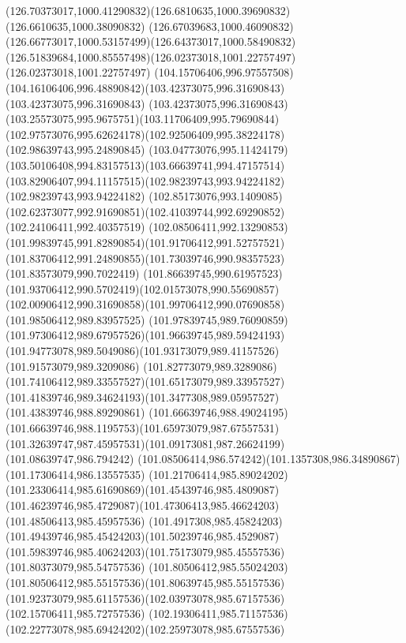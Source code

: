 {    \curveto(126.70373017,1000.41290832)(126.6810635,1000.39690832)(126.6610635,1000.38090832)
    \curveto(126.67039683,1000.46090832)(126.66773017,1000.53157499)(126.64373017,1000.58490832)
    \curveto(126.51839684,1000.85557498)(126.02373018,1001.22757497)(126.02373018,1001.22757497)
    \lineto(104.15706406,996.97557508)
    \curveto(104.16106406,996.48890842)(103.42373075,996.31690843)(103.42373075,996.31690843)
    \curveto(103.42373075,996.31690843)(103.25573075,995.9675751)(103.11706409,995.79690844)
    \curveto(102.97573076,995.62624178)(102.92506409,995.38224178)(102.98639743,995.24890845)
    \curveto(103.04773076,995.11424179)(103.50106408,994.83157513)(103.66639741,994.47157514)
    \curveto(103.82906407,994.11157515)(102.98239743,993.94224182)(102.98239743,993.94224182)
    \lineto(102.85173076,993.1409085)
    \curveto(102.62373077,992.91690851)(102.41039744,992.69290852)(102.24106411,992.40357519)
    \curveto(102.08506411,992.13290853)(101.99839745,991.82890854)(101.91706412,991.52757521)
    \curveto(101.83706412,991.24890855)(101.73039746,990.98357523)(101.83573079,990.7022419)
    \curveto(101.86639745,990.61957523)(101.93706412,990.5702419)(102.01573078,990.55690857)
    \curveto(102.00906412,990.31690858)(101.99706412,990.07690858)(101.98506412,989.83957525)
    \curveto(101.97839745,989.76090859)(101.97306412,989.67957526)(101.96639745,989.59424193)
    \curveto(101.94773078,989.5049086)(101.93173079,989.41157526)(101.91573079,989.3209086)
    \curveto(101.82773079,989.3289086)(101.74106412,989.33557527)(101.65173079,989.33957527)
    \curveto(101.41839746,989.34624193)(101.3477308,989.05957527)(101.43839746,988.89290861)
    \curveto(101.66639746,988.49024195)(101.66639746,988.1195753)(101.65973079,987.67557531)
    \curveto(101.32639747,987.45957531)(101.09173081,987.26624199)(101.08639747,986.794242)
    \curveto(101.08506414,986.574242)(101.1357308,986.34890867)(101.17306414,986.13557535)
    \curveto(101.21706414,985.89024202)(101.23306414,985.61690869)(101.45439746,985.4809087)
    \curveto(101.46239746,985.4729087)(101.47306413,985.46624203)(101.48506413,985.45957536)
    \curveto(101.4917308,985.45824203)(101.49439746,985.45424203)(101.50239746,985.4529087)
    \curveto(101.59839746,985.40624203)(101.75173079,985.45557536)(101.80373079,985.54757536)
    \curveto(101.80506412,985.55024203)(101.80506412,985.55157536)(101.80639745,985.55157536)
    \curveto(101.92373079,985.61157536)(102.03973078,985.67157536)(102.15706411,985.72757536)
    \curveto(102.19306411,985.71157536)(102.22773078,985.69424202)(102.25973078,985.67557536)
}
